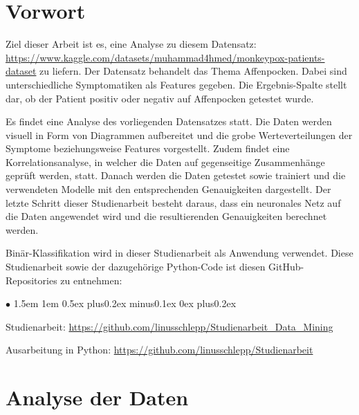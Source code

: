 \documentclass[13pt,a4paper, listof=entryprefix, bibliography=totocnumbered,toc=listofnumbered,lof=listofnumbered]{scrartcl}
\newenvironment{FHitemize}{\begin{list}{$\bullet$} {\leftmargin1.5em \labelsep1em \rightmargin0cm \parsep0.5ex plus0.2ex minus0.1ex \itemsep0ex plus0.2ex}}{\end{list}}
\begin{document}

	\section{Vorwort}
		\label{ch:vorwort}

Ziel dieser Arbeit ist es, eine Analyse zu diesem Datensatz: \linebreak \url{https://www.kaggle.com/datasets/muhammad4hmed/monkeypox-patients-dataset}  
zu liefern. Der Datensatz behandelt das Thema Affenpocken. Dabei sind unterschiedliche Symptomatiken als Features gegeben. Die Ergebnis-Spalte stellt dar, ob 
der Patient positiv oder negativ auf Affenpocken getestet wurde.

Es findet eine Analyse des vorliegenden Datensatzes statt.  Die Daten werden visuell in Form von Diagrammen aufbereitet und die grobe Werteverteilungen
der Symptome beziehungsweise Features vorgestellt. Zudem findet eine Korrelationsanalyse, in welcher die 
Daten auf gegenseitige Zusammenhänge geprüft werden, statt. Danach werden die Daten getestet sowie trainiert und die
verwendeten Modelle mit den entsprechenden Genauigkeiten dargestellt. Der letzte Schritt dieser Studienarbeit
besteht daraus, dass ein neuronales Netz auf die Daten angewendet wird und die resultierenden Genauigkeiten
berechnet werden. 

Binär-Klassifikation wird in dieser Studienarbeit als Anwendung verwendet. Diese Studienarbeit sowie der dazugehörige Python-Code ist diesen
GitHub-Repositories zu entnehmen: 

	\begin{FHitemize}
		\item Studienarbeit: \url{https://github.com/linusschlepp/Studienarbeit_Data_Mining}
		\item Ausarbeitung in Python: \url{https://github.com/linusschlepp/Studienarbeit}
	\end{FHitemize}
	

	\section{Analyse der Daten}
		\label{ch:analyse_daten}
\end{document}
